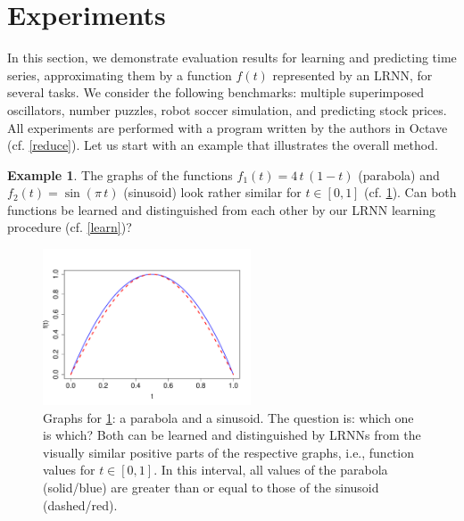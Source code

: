 \documentclass[twoside,11pt]{article}
\theoremstyle{definition}
\newtheorem{exmp}{Example}
\begin{document}
\section{Experiments}\label{result}

In this section, we demonstrate evaluation results for learning and predicting
time series, approximating them by a function $f(t)$ represented by an LRNN,
for several tasks. We consider the following benchmarks: multiple superimposed
oscillators, number puzzles, robot soccer simulation, and predicting stock
prices. All experiments are performed with a program written by the authors in
Octave \citep{EB+17} (cf. \cref{reduce}). Let us start with an example that
illustrates the overall method.

\begin{exmp}\label{quest}
The graphs of the functions $f_1(t) = 4\,t\,(1-t)$ (parabola) and $f_2(t) =
\sin(\pi\,t)$ (sinusoid) look rather similar for $t \in [0,1]$ (cf.
\cref{parasin}). Can both functions be learned and distinguished from each other
by our LRNN learning procedure (cf. \cref{learn})?
\end{exmp}

\begin{figure}
        \centering
	\includegraphics[width=0.55\textwidth]{fig/parasin2} %
	\caption{Graphs for \cref{quest}: a parabola and a sinusoid.
	The question is: which one is which? Both can be learned and
	distinguished by LRNNs from the visually similar positive parts of the
	respective graphs, i.e., function values for $t \in [0, 1]$. In this
	interval, all values of the parabola (solid/blue) are greater than or equal
	to those of the sinusoid (dashed/red).}
	\label{parasin}
\end{figure}
\end{document}
